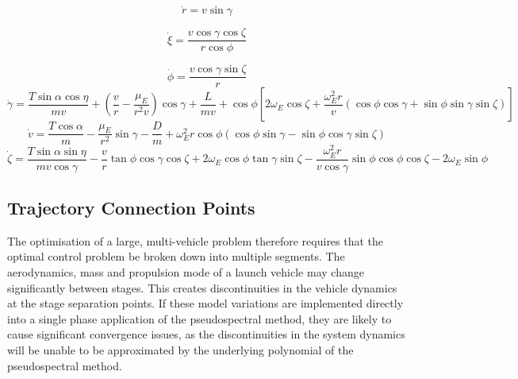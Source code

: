 \begin{equation}
\dot{r} = v \sin \gamma
\end{equation}

\begin{equation}
\dot{\xi} = \frac{v\cos \gamma \cos \zeta}{r \cos \phi}
\end{equation}

\begin{equation}
\dot{\phi} = \frac{v\cos\gamma\sin\zeta}{r}
\end{equation}
\begin{equation}
\dot{\gamma} = \frac{T\sin\alpha \cos\eta}{mv} + (\frac{v}{r}-\frac{\mu_E}{r^2 v})\cos\gamma + \frac{L}{mv}
+ \cos\phi[2\omega_E \cos\zeta + \frac{\omega_E^2 r}{v}(\cos\phi\cos\gamma+\sin\phi\sin\gamma\sin\zeta)]
\end{equation}
\begin{equation}
\dot{v} = \frac{T\cos\alpha}{m}-\frac{\mu_E}{r^2}\sin\gamma - \frac{D}{m}
+ \omega_E^2 r\cos\phi(\cos\phi\sin\gamma-\sin\phi\cos\gamma\sin\zeta)
\end{equation}
\begin{equation}
\dot{\zeta} = \frac{T\sin\alpha \sin\eta}{mv \cos \gamma}-\frac{v}{r}\tan\phi\cos\gamma\cos\zeta +2\omega_E\cos\phi\tan\gamma\sin\zeta - \frac{\omega_E^2 r}{v\cos\gamma}\sin\phi\cos\phi\cos\zeta-2\omega_E\sin\phi 
\end{equation}

\subsection{Trajectory Connection Points}
The optimisation of a large, multi-vehicle problem therefore requires that the optimal control problem be broken down into multiple segments.
The aerodynamics, mass and propulsion mode of a launch vehicle may change significantly between stages. 
This creates discontinuities in the vehicle dynamics at the stage separation points. 
If these model variations are implemented directly into a single phase application of the pseudospectral method, they are likely to cause significant convergence issues, as the discontinuities in the system dynamics will be unable to be approximated by the underlying polynomial of the pseudospectral method. 

